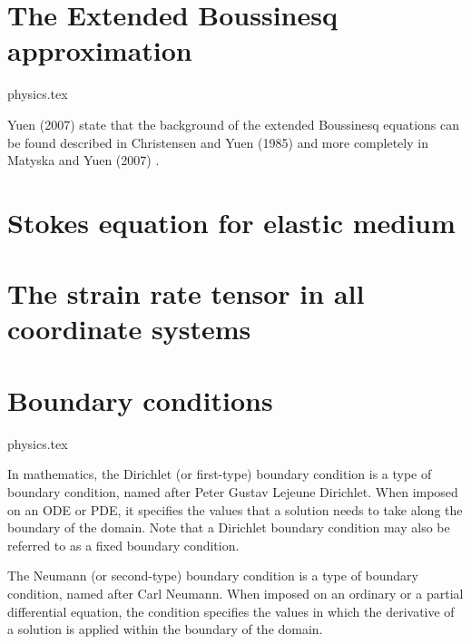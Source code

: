 \section{The Extended Boussinesq approximation}
\begin{flushright} {\tiny {\color{gray} physics.tex}} \end{flushright}

Yuen \etal (2007) \cite{yumc07} state that the background of the extended Boussinesq 
equations can be found described in 
Christensen and Yuen (1985) \cite{chyu85} and more completely in Matyska and Yuen (2007) \cite{mayu07}.

\Literature \cite{hayk91,hayk93}

\newpage
\section{Stokes equation for elastic medium}







\newpage
\section{The strain rate tensor in all coordinate systems}



\newpage
\section{Boundary conditions}
\begin{flushright} {\tiny {\color{gray} physics.tex}} \end{flushright}

In mathematics, the Dirichlet (or first-type) 
boundary condition is a type of boundary condition, named after Peter Gustav Lejeune Dirichlet.
When imposed on an ODE or PDE, it specifies the values that a solution needs 
to take along the boundary of the domain.
Note that a Dirichlet boundary condition may also be referred to as a fixed boundary condition. 

The Neumann (or second-type) boundary condition is a type of boundary condition, 
named after Carl Neumann. When imposed on an ordinary or a partial differential equation, 
the condition specifies the values in which the derivative of a solution is 
applied within the boundary of the domain.

